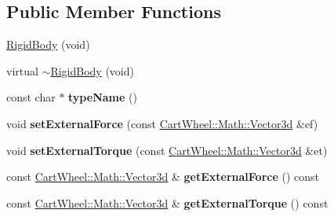 \subsection*{Public Member Functions}
\begin{DoxyCompactItemize}
\item 
\hyperlink{classCartWheel_1_1Physics_1_1RigidBody_ab91c3f0c53842a1b9381cd8a13276f0e}{RigidBody} (void)
\item 
virtual \hyperlink{classCartWheel_1_1Physics_1_1RigidBody_ac352781e5e8c394d35e203197dd2e893}{$\sim$RigidBody} (void)
\item 
\hypertarget{classCartWheel_1_1Physics_1_1RigidBody_a09635f06359d221367e7683c45fd8d19}{
const char $\ast$ {\bfseries typeName} ()}
\label{classCartWheel_1_1Physics_1_1RigidBody_a09635f06359d221367e7683c45fd8d19}

\item 
\hypertarget{classCartWheel_1_1Physics_1_1RigidBody_a19f32c11ee7495c55b3fcd55193cd93f}{
void {\bfseries setExternalForce} (const \hyperlink{classCartWheel_1_1Math_1_1Vector3d}{CartWheel::Math::Vector3d} \&ef)}
\label{classCartWheel_1_1Physics_1_1RigidBody_a19f32c11ee7495c55b3fcd55193cd93f}

\item 
\hypertarget{classCartWheel_1_1Physics_1_1RigidBody_a095c38ddafbc59f78d4c5839d56109cb}{
void {\bfseries setExternalTorque} (const \hyperlink{classCartWheel_1_1Math_1_1Vector3d}{CartWheel::Math::Vector3d} \&et)}
\label{classCartWheel_1_1Physics_1_1RigidBody_a095c38ddafbc59f78d4c5839d56109cb}

\item 
\hypertarget{classCartWheel_1_1Physics_1_1RigidBody_ab2d7edf000f4f3f2e2bc685278258c80}{
const \hyperlink{classCartWheel_1_1Math_1_1Vector3d}{CartWheel::Math::Vector3d} \& {\bfseries getExternalForce} () const }
\label{classCartWheel_1_1Physics_1_1RigidBody_ab2d7edf000f4f3f2e2bc685278258c80}

\item 
\hypertarget{classCartWheel_1_1Physics_1_1RigidBody_a928bd4cb4883201a615d7a93fcb59957}{
const \hyperlink{classCartWheel_1_1Math_1_1Vector3d}{CartWheel::Math::Vector3d} \& {\bfseries getExternalTorque} () const }
\label{classCartWheel_1_1Physics_1_1RigidBody_a928bd4cb4883201a615d7a93fcb59957}


\end{DoxyCompactItemize}

